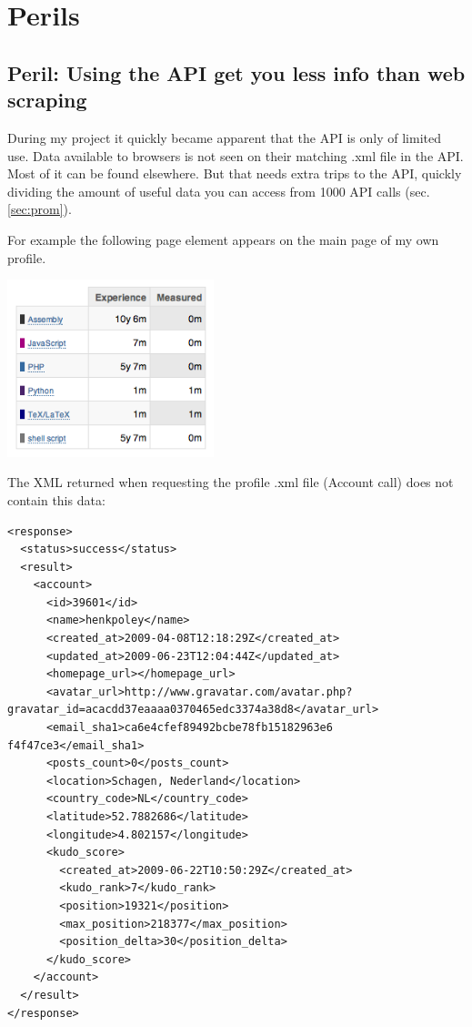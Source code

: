 \documentclass{sig-alternate}
\begin{document}
\section{Perils}

\subsection{Peril: Using the API get you less info than web scraping}\label{sec:api-vs-scraping}
During my project it quickly became apparent that the API is only of limited use. Data available to browsers is not seen on their matching .xml file in the API. Most of it can be found elsewhere. But that needs extra trips to the API, quickly dividing the amount of useful data you can access from 1000 API calls (sec. \ref{sec:prom}).

For example the following page element appears on the main page of my own profile.

\includegraphics[width=60mm]{LanguageExperience.png}

The XML returned when requesting the profile .xml file (Account call) does not contain this data:

\lstset{language=XML, breaklines=true}
\begin{lstlisting}
<response> 
  <status>success</status> 
  <result> 
    <account> 
      <id>39601</id> 
      <name>henkpoley</name> 
      <created_at>2009-04-08T12:18:29Z</created_at> 
      <updated_at>2009-06-23T12:04:44Z</updated_at> 
      <homepage_url></homepage_url> 
      <avatar_url>http://www.gravatar.com/avatar.php?gravatar_id=acacdd37eaaaa0370465edc3374a38d8</avatar_url> 
      <email_sha1>ca6e4cfef89492bcbe78fb15182963e6 f4f47ce3</email_sha1> 
      <posts_count>0</posts_count> 
      <location>Schagen, Nederland</location> 
      <country_code>NL</country_code> 
      <latitude>52.7882686</latitude> 
      <longitude>4.802157</longitude> 
      <kudo_score> 
        <created_at>2009-06-22T10:50:29Z</created_at> 
        <kudo_rank>7</kudo_rank> 
        <position>19321</position> 
        <max_position>218377</max_position> 
        <position_delta>30</position_delta> 
      </kudo_score> 
    </account> 
  </result> 
</response> 
\end{lstlisting}
\end{document}
